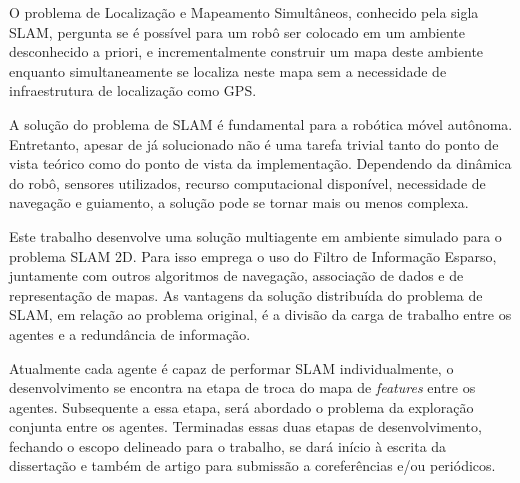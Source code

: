 O problema de Localização e Mapeamento Simultâneos, conhecido pela sigla SLAM, pergunta se é possível para um robô ser colocado em um ambiente 
desconhecido a priori, e incrementalmente construir um mapa deste 
ambiente enquanto simultaneamente se localiza neste mapa sem a 
necessidade de infraestrutura de localização como GPS.

A solução do problema de SLAM é fundamental para a robótica móvel 
autônoma. Entretanto, apesar de já solucionado não é uma tarefa trivial 
tanto do ponto de vista teórico como do ponto de vista da implementação. 
Dependendo da dinâmica do robô, sensores utilizados, recurso 
computacional disponível, necessidade de navegação e guiamento, a solução 
pode se tornar mais ou menos complexa.

Este trabalho desenvolve uma solução multiagente em ambiente simulado 
para o problema SLAM 2D. Para isso emprega o uso do Filtro de Informação 
Esparso, juntamente com outros algoritmos de navegação, associação de 
dados e de representação de mapas. As vantagens da solução distribuída do 
problema de SLAM, em relação ao problema original, é a divisão da carga 
de trabalho entre os agentes e a redundância de informação.

Atualmente cada agente é capaz de performar SLAM individualmente, o desenvolvimento se encontra na etapa de troca do mapa de \textit{features} entre os agentes. Subsequente a essa etapa, será abordado o problema da exploração conjunta entre os agentes. Terminadas essas duas 
etapas de desenvolvimento, fechando o escopo delineado para o trabalho, 
se dará início à escrita da dissertação e também de artigo para submissão 
a coreferências e/ou periódicos.